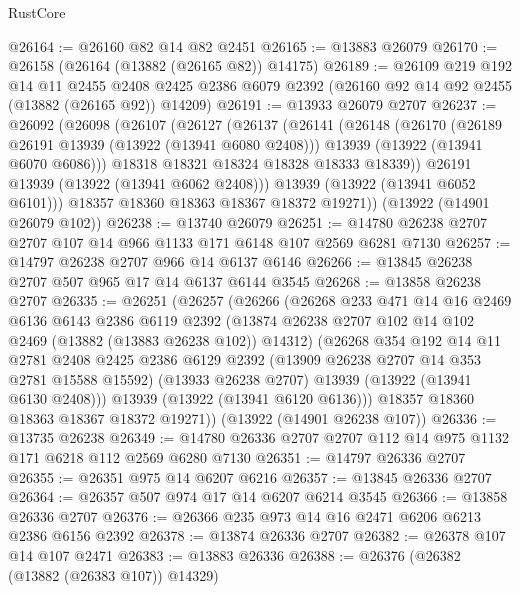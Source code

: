 \begin{lexlean}{RustCore}
\begin{coremodule}
@26164 := @26160 @82 @14 @82 @2451
@26165 := @13883 @26079
@26170 := @26158 (@26164 (@13882 (@26165 @82)) @14175)
@26189 := @26109
    @219
    @192
    @14
    @11
    @2455
    @2408
    @2425
    @2386
    @6079
    @2392
    (@26160 @92 @14 @92 @2455 (@13882 (@26165 @92)) @14209)
@26191 := @13933 @26079 @2707
@26237 := @26092
    (@26098
      (@26107
        (@26127
          (@26137
            (@26141
              (@26148
                (@26170
                  (@26189 @26191 @13939 (@13922 (@13941 @6080 @2408)))
                  @13939
                  (@13922 (@13941 @6070 @6086)))
                @18318
                @18321
                @18324
                @18328
                @18333
                @18339))
            @26191
            @13939
            (@13922 (@13941 @6062 @2408)))
          @13939
          (@13922 (@13941 @6052 @6101)))
        @18357
        @18360
        @18363
        @18367
        @18372
        @19271))
    (@13922 (@14901 @26079 @102))
@26238 := @13740 @26079
@26251 := @14780 @26238 @2707 @2707 @107 @14 @966 @1133 @171 @6148 @107 @2569 @6281 @7130
@26257 := @14797 @26238 @2707 @966 @14 @6137 @6146
@26266 := @13845 @26238 @2707 @507 @965 @17 @14 @6137 @6144 @3545
@26268 := @13858 @26238 @2707
@26335 := @26251
    (@26257
      (@26266
        (@26268
          @233
          @471
          @14
          @16
          @2469
          @6136
          @6143
          @2386
          @6119
          @2392
          (@13874 @26238 @2707 @102 @14 @102 @2469 (@13882 (@13883 @26238 @102)) @14312)
          (@26268
            @354
            @192
            @14
            @11
            @2781
            @2408
            @2425
            @2386
            @6129
            @2392
            (@13909 @26238 @2707 @14 @353 @2781 @15588 @15592)
            (@13933 @26238 @2707)
            @13939
            (@13922 (@13941 @6130 @2408)))
          @13939
          (@13922 (@13941 @6120 @6136)))
        @18357
        @18360
        @18363
        @18367
        @18372
        @19271))
    (@13922 (@14901 @26238 @107))
@26336 := @13735 @26238
@26349 := @14780 @26336 @2707 @2707 @112 @14 @975 @1132 @171 @6218 @112 @2569 @6280 @7130
@26351 := @14797 @26336 @2707
@26355 := @26351 @975 @14 @6207 @6216
@26357 := @13845 @26336 @2707
@26364 := @26357 @507 @974 @17 @14 @6207 @6214 @3545
@26366 := @13858 @26336 @2707
@26376 := @26366 @235 @973 @14 @16 @2471 @6206 @6213 @2386 @6156 @2392
@26378 := @13874 @26336 @2707
@26382 := @26378 @107 @14 @107 @2471
@26383 := @13883 @26336
@26388 := @26376 (@26382 (@13882 (@26383 @107)) @14329)

\end{coremodule}
\end{lexlean}
